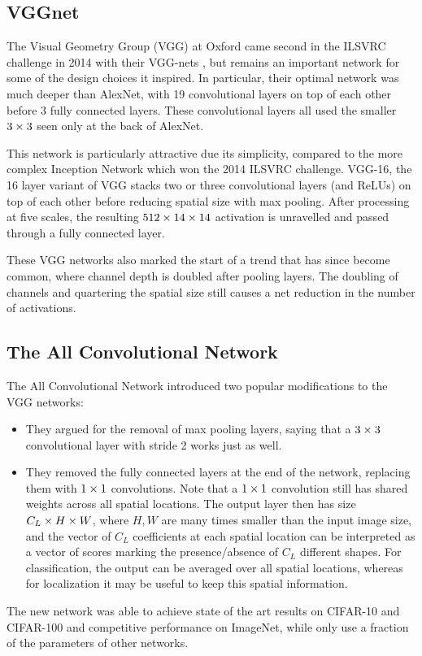 \subsection{VGGnet}
The Visual Geometry Group (VGG) at Oxford came second in the ILSVRC challenge in
2014 with their VGG-nets \cite{simonyan_very_2014}, but remains an important
network for some of the design choices it inspired. In particular, their optimal
network was much deeper than AlexNet, with 19 convolutional layers on top of
each other before 3 fully connected layers. These convolutional layers all used
the smaller $3\times 3$ seen only at the back of AlexNet.

This network is particularly attractive due its simplicity, compared to the 
more complex Inception Network \cite{szegedy_going_2015} which won the 2014
ILSVRC challenge. VGG-16, the 16 layer variant of VGG stacks two or three
convolutional layers (and ReLUs) on top of each other before reducing spatial
size with max pooling. After processing at five scales, the resulting $512 \times 14
\times 14$ activation is unravelled and passed through a fully connected layer.

These VGG networks also marked the start of a trend that has since become
common, where channel depth is doubled after pooling layers. The doubling of
channels and quartering the spatial size still causes a net reduction in the
number of activations.

\subsection{The All Convolutional Network}
The All Convolutional Network \cite{springenberg_striving_2014-3} introduced two
popular modifications to the VGG networks:
%
\begin{itemize}
  \item They argued for the removal of max pooling layers, saying that a $3\times 3$
    convolutional layer with stride 2 works just as well.
  \item They removed the fully connected layers at the end of the network,
    replacing them with $1\times 1$ convolutions. Note that a $1\times 1$ convolution
    still has shared weights across all spatial locations. The output layer then
    has size $C_L \times H \times W$, where $H, W$ are many times smaller than the input
    image size, and the vector of $C_L$ coefficients at each spatial location
    can be interpreted as a vector of scores marking the presence/absence of
    $C_L$ different shapes. For classification, the output can be averaged over
    all spatial locations, whereas for localization it may be useful to keep
    this spatial information.
\end{itemize}
The new network was able to achieve state of the art results on CIFAR-10 and
CIFAR-100 and competitive performance on ImageNet, while only use a fraction of
the parameters of other networks.

